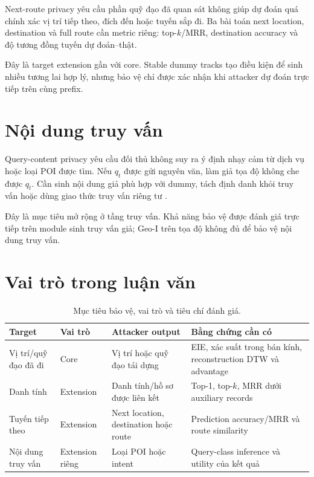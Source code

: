 \documentclass[12pt,a4paper,oneside]{report}
\begin{document}
Next-route privacy yêu cầu phần quỹ đạo đã quan sát không giúp dự đoán quá chính xác vị trí tiếp theo, đích đến hoặc tuyến sắp đi. Ba bài toán next location, destination và full route cần metric riêng: top-$k$/MRR, destination accuracy và độ tương đồng tuyến dự đoán--thật.

Đây là target extension gần với core. Stable dummy tracks tạo điều kiện để sinh nhiều tương lai hợp lý, nhưng bảo vệ chỉ được xác nhận khi attacker dự đoán trực tiếp trên cùng prefix.

\section{Nội dung truy vấn}

Query-content privacy yêu cầu đối thủ không suy ra ý định nhạy cảm từ dịch vụ hoặc loại POI được tìm. Nếu $q_t$ được gửi nguyên văn, làm giả tọa độ không che được $q_t$. Cần sinh nội dung giả phù hợp với dummy, tách định danh khỏi truy vấn hoặc dùng giao thức truy vấn riêng tư \citep{wu2021fakequery,liu2026fakequeries}.

Đây là mục tiêu mở rộng ở tầng truy vấn. Khả năng bảo vệ được đánh giá trực tiếp trên module sinh truy vấn giả; Geo-I trên tọa độ không đủ để bảo vệ nội dung truy vấn.

\section{Vai trò trong luận văn}

\begin{table}[htbp]
\centering
\small
\caption{Mục tiêu bảo vệ, vai trò và tiêu chí đánh giá.}
\label{tab:targets}
\begin{tabularx}{\textwidth}{P{2.7cm}P{3.0cm}Y Y}
\toprule
\textbf{Target} & \textbf{Vai trò} & \textbf{Attacker output} & \textbf{Bằng chứng cần có} \\
\midrule
Vị trí/quỹ đạo đã đi & Core & Vị trí hoặc quỹ đạo tái dựng & EIE, xác suất trong bán kính, reconstruction DTW và advantage \\
Danh tính & Extension & Danh tính/hồ sơ được liên kết & Top-1, top-$k$, MRR dưới auxiliary records \\
Tuyến tiếp theo & Extension & Next location, destination hoặc route & Prediction accuracy/MRR và route similarity \\
Nội dung truy vấn & Extension riêng & Loại POI hoặc intent & Query-class inference và utility của kết quả \\
\bottomrule
\end{tabularx}
\end{table}
\end{document}
